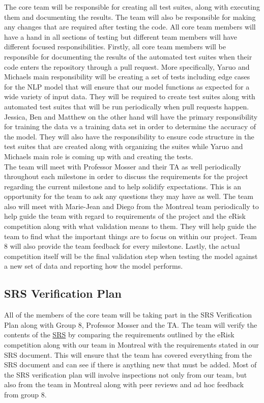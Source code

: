 \documentclass[12pt, titlepage]{article}
\begin{document}
  The core team will be responsible for creating all test suites, along with executing them and documenting the results. The team will also be responsible for making any changes that are required after testing the code. All core team members will have a hand in all sections of testing but different team members will have different focused responsibilities. Firstly, all core team members will be responsible for documenting the results of the automated test suites when their code enters the repository through a pull request. More specifically, Yaruo and Michaels main responsibility will be creating a set of tests including edge cases for the NLP model that will ensure that our model functions as expected for a wide variety of input data. They will be required to create test suites along with automated test suites that will be run periodically when pull requests happen. Jessica, Ben and Matthew on the other hand will have the primary responsibility for training the data vs a training data set in order to determine the accuracy of the model. They will also have the responsibility to ensure code structure in the test suites that are created along with organizing the suites while Yaruo and Michaels main role is coming up with and creating the tests.\\ 
  
  The team will meet with Professor Mosser and their TA as well periodically throughout each milestone in order to discuss the requirements for the project regarding the current milestone and to help solidify expectations. This is an opportunity for the team to ask any questions they may have as well. The team also will meet with Marie-Jean and Diego from the Montreal team periodically to help guide the team with regard to requirements of the project and the eRisk competition along with what validation means to them. They will help guide the team to find what the important things are to focus on within our project. Team 8 will also provide the team feedback for every milestone. Lastly, the actual competition itself will be the final validation step when testing the model against a new set of data and reporting how the model performs.\\

  
  \subsection{SRS Verification Plan} \label{SRS Verification Plan}
  
  All of the members of the core team will be taking part in the SRS Verification Plan along with Group 8, Professor Mosser and the TA. The team will verify the contents of the \href{https://github.com/MichaelBreau/nlp-mentalhealth/blob/main/docs/SRS/index.pdf}{SRS} by comparing the requirements outlined by the eRisk competition along with our team in Montreal with the requirements stated in our SRS document. This will ensure that the team has covered everything from the SRS document and can see if there is anything new that must be added. Most of the SRS verification plan will involve inspections not only from our team, but also from the team in Montreal along with peer reviews and ad hoc feedback from group 8.\\
  
\end{document}
